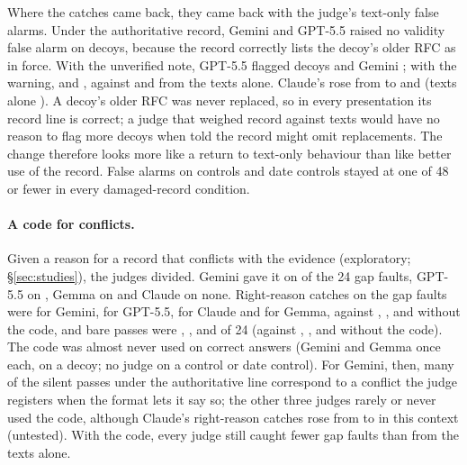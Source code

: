 Where the catches came back, they came back with the judge's text-only false alarms. Under the authoritative record,
Gemini and GPT-5.5 raised no validity false alarm on decoys, because the record correctly lists the decoy's older RFC as
in force. With the unverified note, GPT-5.5 flagged \EGPTDecoyFALowauth{} decoys and Gemini \EGeminiDecoyFALowauth; with
the warning, \EGPTDecoyFACaveat{} and \EGeminiDecoyFACaveat, against \EGPTDecoyFATexts{} and \EGeminiDecoyFATexts{}
from the texts alone. Claude's rose from \EOpusDecoyFADamaged{} to \EOpusDecoyFALowauth{} and \EOpusDecoyFACaveat{}
(texts alone \EOpusDecoyFATexts). A decoy's older RFC was never replaced, so in every presentation its record line is
correct; a judge that weighed record against texts would have no reason to flag more decoys when told the
record might omit replacements. The change therefore looks more like a return to text-only behaviour than like better
use of the record. False alarms on controls and date controls stayed at one of 48 or fewer in every damaged-record
condition.

\paragraph{A code for conflicts.} Given a reason for a record that conflicts with the evidence (exploratory;
\S\ref{sec:studies}), the judges divided. Gemini gave it on \EGeminiConflictCodeGap{} of the 24 gap faults, GPT-5.5
on \EGPTConflictCodeGap, Gemma on \EGemmaConflictCodeGap{} and Claude on none. Right-reason catches on the gap faults
were \EGeminiGapConflict{} for Gemini, \EGPTGapConflict{} for GPT-5.5, \EOpusGapConflict{} for Claude and
\EGemmaGapConflict{} for Gemma, against \EGeminiGapDamaged, \EGPTGapDamaged, \EOpusGapDamaged{} and
\EGemmaGapDamaged{} without the code, and bare passes were \EGeminiBareConflict, \EGPTBareConflict,
\EOpusBareConflict{} and \EGemmaBareConflict{} of 24 (against \EGeminiBareDamaged, \EGPTBareDamaged, \EOpusBareDamaged{} and
\EGemmaBareDamaged{} without the code). The code was almost never used on correct answers (Gemini and
Gemma once each, on a decoy; no judge on a control or date control). For Gemini, then, many of the silent passes under
the authoritative line correspond to a conflict the judge registers when the format lets it say so; the other
three judges rarely or never used the code, although Claude's right-reason catches rose from \EOpusGapDamaged{} to
\EOpusGapConflict{} in this context (untested). With the code, every judge still caught fewer gap faults than from the texts
alone.

